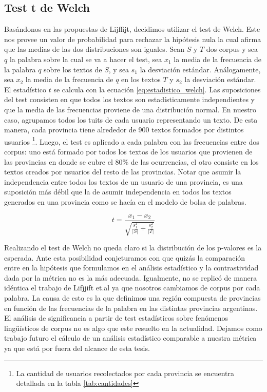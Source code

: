\subsection{Test t de Welch}
Basándonos en las propuestas de Lijffijt, decidimos utilizar el test de Welch. Este nos provee un valor de probabilidad para rechazar la hipótesis nula la cual afirma que las medias de las dos distribuciones son iguales. Sean $S$ y $T$ dos corpus y sea $q$ la palabra sobre la cual se va a hacer el test, sea $x_1$ la media de la frecuencia de la palabra $q$ sobre los textos de $S$, y sea $s_1$ la desviación estándar. Análogamente, sea $x_2$ la media de la frecuencia de $q$ en los textos $T$ y $s_2$ la desviación estándar. El estadístico $t$ se calcula con la ecuación \ref{eq:estadistico_welch}. Las suposiciones del test consisten en que todos los textos son estadísticamente independientes y que la media de las frecuencias proviene de una distribución normal. En nuestro caso, agrupamos todos los tuits de cada usuario representando un texto. De esta manera, cada provincia tiene alrededor de 900 textos formados por distintos usuarios \footnote{La cantidad de usuarios recolectados por cada provincia se encuentra detallada en la tabla \ref{tab:cantidades}}. Luego, el test es aplicado a cada palabra con las frecuencias entre dos corpus: uno está formado por todos los textos de los usuarios que provienen de las provincias en donde se cubre el 80\% de las ocurrencias, el otro consiste en los textos creados por usuarios del resto de las provincias. Notar que asumir la independencia entre todos los textos de un usuario de una provincia, es una suposición más débil que la de asumir independencia en todos los textos generados en una provincia como se hacía en el modelo de bolsa de palabras. 

\begin{equation}
\label{eq:estadistico_welch}
 t = \frac{x_1-x_2}{\sqrt{\frac{s_1^2}{\lvert S \rvert}+\frac{s_2^2}{\lvert T \rvert}}}  
\end{equation}

Realizando el test de Welch no queda claro si la distribución de los p-valores es la esperada. Ante esta posibilidad conjeturamos con que quizás la comparación entre en la hipótesis que formulamos en el análisis estadístico y la contrastividad dada por la métrica no es la más adecuada. Igualmente, no se replicó de manera idéntica el trabajo de Lifjjift et.al ya que nosotros cambiamos de corpus por cada palabra. La causa de esto es la que definimos una región compuesta de provincias en función de las frecuencias de la palabra en las distintas provincias argentinas. El análisis de significancia a partir de test estadísticos sobre fenómenos lingüísticos de corpus no es algo que este resuelto en la actualidad. Dejamos como trabajo futuro el cálculo de un  análisis estadístico comparable a nuestra métrica ya que está por fuera del alcance de esta tesis.

